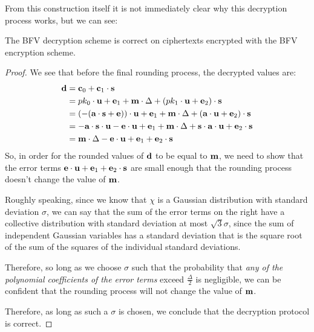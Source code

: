 \documentclass{theme}
\begin{document}
From this construction itself it is not immediately clear why this decryption process works, but we can see:

\begin{ndefinition}
    The BFV decryption scheme is correct on ciphertexts encrypted with the BFV encryption scheme.
\end{ndefinition}

\begin{proof}
    We see that before the final rounding process, the decrypted values are:
    \begin{align}
        \textbf{d} & = \textbf{c}_0 + \textbf{c}_1 \cdot \textbf{s}                                                                                                           \\
              & = pk_0 \cdot \textbf{u} + \textbf{e}_1 + \textbf{m} \cdot \Delta + ( pk_1 \cdot \textbf{u} + \textbf{e}_2) \cdot \textbf{s}                                             \\
              & = (-(\textbf{a} \cdot \textbf{s} + \textbf{e})) \cdot \textbf{u} + \textbf{e}_1 + \textbf{m} \cdot \Delta + ( \textbf{a} \cdot \textbf{u} + \textbf{e}_2) \cdot \textbf{s}                  \\
              & = -\textbf{a} \cdot \textbf{s} \cdot \textbf{u} - \textbf{e} \cdot \textbf{u} + \textbf{e}_1 + \textbf{m} \cdot \Delta + \textbf{s} \cdot \textbf{a} \cdot \textbf{u} + \textbf{e}_2 \cdot \textbf{s} \\
              & = \textbf{m} \cdot \Delta - \textbf{e} \cdot \textbf{u} + \textbf{e}_1 + \textbf{e}_2 \cdot \textbf{s}
    \end{align}
    So, in order for the rounded values of $\textbf{d}$ to be equal to $\textbf{m}$, we need to show that the error terms $\textbf{e} \cdot \textbf{u} + \textbf{e}_1 + \textbf{e}_2 \cdot \textbf{s}$ are small enough that the rounding process doesn't change the value of $\textbf{m}$.

    Roughly speaking, since we know that $\chi$ is a Gaussian distribution with standard deviation $\sigma$, we can say that the sum of the error terms on the right have a collective distribution with standard deviation at most $\sqrt{3} \sigma$, since the sum of independent Gaussian variables has a standard deviation that is the square root of the sum of the squares of the individual standard deviations.

    Therefore, so long as we choose $\sigma$ such that the probability that \textit{any of the polynomial coefficients of the error terms} exceed $\frac{\Delta}{2}$ is negligible, we can be confident that the rounding process will not change the value of $\textbf{m}$.

    Therefore, as long as such a $\sigma$ is chosen, we conclude that the decryption protocol is correct.
\end{proof}
\end{document}
